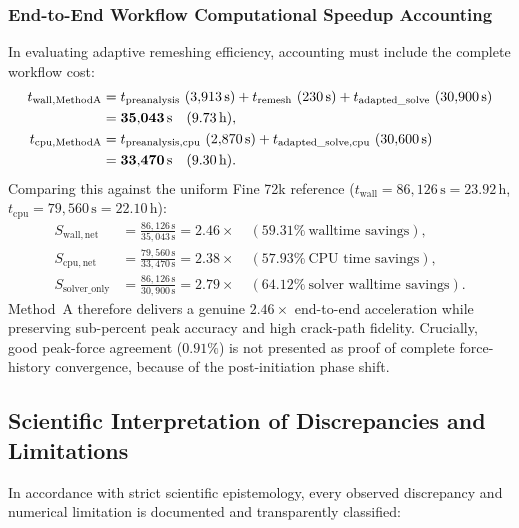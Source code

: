\subsubsection{End-to-End Workflow Computational Speedup Accounting}
In evaluating adaptive remeshing efficiency, accounting must include the complete workflow cost:
\begin{align}
  t_{\mathrm{wall,MethodA}} &= t_{\mathrm{preanalysis}}\ (3{,}913\,\mathrm{s}) + t_{\mathrm{remesh}}\ (230\,\mathrm{s}) + t_{\mathrm{adapted\_solve}}\ (30{,}900\,\mathrm{s}) \notag \\
  &= \mathbf{35{,}043\,\mathrm{s}} \quad (9.73\,\mathrm{h}), \\
  t_{\mathrm{cpu,MethodA}} &= t_{\mathrm{preanalysis,cpu}}\ (2{,}870\,\mathrm{s}) + t_{\mathrm{adapted\_solve,cpu}}\ (30{,}600\,\mathrm{s}) \notag \\
  &= \mathbf{33{,}470\,\mathrm{s}} \quad (9.30\,\mathrm{h}).
\end{align}
Comparing this against the uniform Fine 72k reference ($t_{\mathrm{wall}} = 86{,}126\,\mathrm{s} = 23.92\,\mathrm{h}$, $t_{\mathrm{cpu}} = 79{,}560\,\mathrm{s} = 22.10\,\mathrm{h}$):
\begin{align}
  S_{\mathrm{wall,net}} &= \frac{86{,}126\,\mathrm{s}}{35{,}043\,\mathrm{s}} = \mathbf{2.46\times} \quad (\mathbf{59.31\%}\ \text{walltime savings}), \\
  S_{\mathrm{cpu,net}} &= \frac{79{,}560\,\mathrm{s}}{33{,}470\,\mathrm{s}} = \mathbf{2.38\times} \quad (\mathbf{57.93\%}\ \text{CPU time savings}), \\
  S_{\mathrm{solver\_only}} &= \frac{86{,}126\,\mathrm{s}}{30{,}900\,\mathrm{s}} = \mathbf{2.79\times} \quad (\mathbf{64.12\%}\ \text{solver walltime savings}).
\end{align}
Method~A therefore delivers a genuine $2.46\times$ end-to-end acceleration while preserving sub-percent peak accuracy and high crack-path fidelity. Crucially, good peak-force agreement ($0.91\%$) is not presented as proof of complete force-history convergence, because of the post-initiation phase shift.

\subsection{Scientific Interpretation of Discrepancies and Limitations}
\label{subsec:mode2_discrepancies_and_limitations}

In accordance with strict scientific epistemology, every observed discrepancy and numerical limitation is documented and transparently classified:

